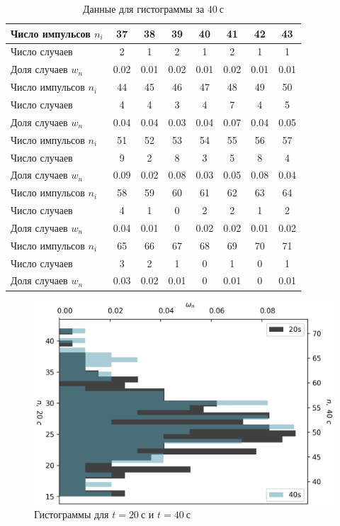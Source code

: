 \documentclass[a4paper, 12pt]{article}
\begin{document}
    \begin{table}[!ht]
    	\centering
    	\begin{tabular}{|l|c|c|c|c|c|c|c|}
    		\hline
    		Число импульсов $n_i$ &  37  &  38  &  39  &  40  &  41  &  42  &  43    \\ \hline
    		Число случаев         &  2   &  1   &  2   &  1   &  2   &  1   &  1     \\ \hline
    		Доля случаев $w_n$    & 0.02 & 0.01 & 0.02 & 0.01 & 0.02 & 0.01 & 0.01   \\ \hline\hline
    		Число импульсов $n_i$ &  44  &  45  &  46  &  47  &  48  &  49  &  50    \\ \hline
    		Число случаев         &  4   &  4   &  3   &  4   &  7   &  4   &  5     \\ \hline
    		Доля случаев $w_n$    & 0.04 & 0.04 & 0.03 & 0.04 & 0.07 & 0.04 & 0.05   \\ \hline\hline
    		Число импульсов $n_i$ &  51  &  52  &  53  &  54  &  55  &  56  &  57    \\ \hline
    		Число случаев         &  9   &  2   &  8   &  3   &  5   &  8   &  4     \\ \hline
    		Доля случаев $w_n$    & 0.09 & 0.02 & 0.08 & 0.03 & 0.05 & 0.08 & 0.04   \\ \hline\hline
    		Число импульсов $n_i$ &  58  &  59  &  60  &  61  &  62  &  63  &  64    \\ \hline
    		Число случаев         &  4   &  1   &  0   &  2   &  2   &  1   &  2     \\ \hline
    		Доля случаев $w_n$    & 0.04 & 0.01 &  0   & 0.02 & 0.02 & 0.01 & 0.02   \\ \hline\hline
    		Число импульсов $n_i$ &  65  &  66  &  67  &  68  &  69  &  70  &  71    \\ \hline
    		Число случаев         &  3   &  2   &  1   &  0   &  1   &  0   &  1     \\ \hline
    		Доля случаев $w_n$    & 0.03 & 0.02 & 0.01 &  0   & 0.01 &  0   & 0.01   \\ \hline
    	\end{tabular}
    	\caption{Данные для гистограммы за $40 \ с$}
    	\label{gist40 }
    \end{table}

    \newpage
    \begin{figure}
        \includegraphics[scale=0.5]{histogram.png}
        \caption{Гистограммы для $t=20 \ с$ и $t=40 \ с$}
    \end{figure}
\end{document}
